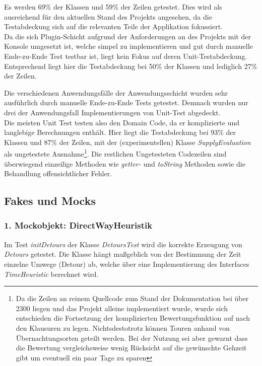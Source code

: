 Es werden 69\% der Klassen und 59\% der Zeilen getestet. 
Dies wird als ausreichend für den aktuellen Stand des Projekts angesehen, da die Testabdeckung sich auf die relevanten Teile der Applikation fokussiert.\\

Da die sich Plugin-Schicht aufgrund der Anforderungen an des Projekts mit der Konsole umgesetzt ist, welche simpel zu implementieren und gut durch manuelle Ende-zu-Ende Test testbar ist, liegt kein Fokus auf deren Unit-Testabdeckung. Entsprechend liegt hier die Testabdeckung bei 50\% der Klassen und lediglich 27\% der Zeilen.

Die verschiedenen Anwendungsfälle der Anwendungsschicht wurden sehr ausführlich durch manuelle Ende-zu-Ende Tests getestet. Demnach wurden nur drei der Anwendungsfall Implementierungen von Unit-Test abgedeckt.\\

 Die meisten Unit Test testen also den Domain Code, da er komplizierte und langlebige Berechnungen enthält.
Hier liegt die Testabdeckung bei 93\% der Klassen und 87\% der Zeilen, mit der (experimentellen) Klasse \textit{SupplyEvaluation} als ungetestete Ausnahme\footnote{Da die Zeilen an reinem Quellcode zum Stand der Dokumentation bei über 2300 liegen und das Projekt alleine implementiert wurde, wurde sich entschieden die Fortsetzung der komplizierten Bewertungsfunktion auf nach den Klausuren zu legen. Nichtsdestotrotz können Touren anhand von Übernachtungsorten geteilt werden. Bei der Nutzung sei aber gewarnt dass die Bewertung vergleichsweise wenig Rücksicht auf die gewünschte Gehzeit gibt um eventuell ein paar Tage zu sparen}.
 Die restlichen Ungetesteten Codezeilen sind überwiegend einzeilige Methoden wie \textit{getter-} und \textit{toString} Methoden sowie die Behandlung offensichtlicher Fehler.

\subsection{Fakes und Mocks}
 
 \subsubsection{1. Mockobjekt: DirectWayHeuristik}
 
 Im Test \textit{initDetours} der Klasse \textit{DetoursTest} wird die korrekte Erzeugung von \textit{Detours} getestet.
 Die Klasse hängt maßgeblich von der Bestimmung der Zeit einzelne Umwege (Detour) ab, welche über eine Implementierung des Interfaces \textit{TimeHeuristic} berechnet wird. \\
  
